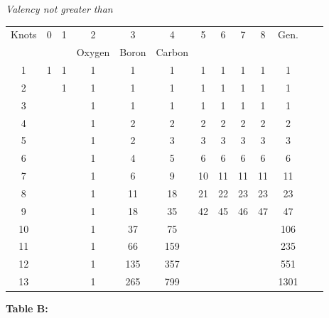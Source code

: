 \documentclass[11pt,a4paper]{article}
\begin{document}
\begin{small}
\begin{center}
\textit{Valency not greater than}
\end{center}
\begin{center}
\begin{tabular}{|c|c|cc|cc|cccccc|c|}
\hline
Knots & 0 & 1 & 2 & 3 & 4 & 5 & 6 & 7 & 8 & Gen. \\
      &   &   & Oxygen & Boron & Carbon & & & & & \\
\hline
1  & 1 & 1 & 1 & 1 & 1 & 1 & 1 & 1 & 1 & 1 \\
2  &   & 1 & 1 & 1 & 1 & 1 & 1 & 1 & 1 & 1 \\
3  &   &   & 1 & 1 & 1 & 1 & 1 & 1 & 1 & 1 \\
4  &   &   & 1 & 2 & 2 & 2 & 2 & 2 & 2 & 2 \\
5  &   &   & 1 & 2 & 3 & 3 & 3 & 3 & 3 & 3 \\
6  &   &   & 1 & 4 & 5 & 6 & 6 & 6 & 6 & 6 \\
7  &   &   & 1 & 6 & 9 & 10 & 11 & 11 & 11 & 11 \\
8  &   &   & 1 & 11 & 18 & 21 & 22 & 23 & 23 & 23 \\
9  &   &   & 1 & 18 & 35 & 42 & 45 & 46 & 47 & 47 \\
10 &   &   & 1 & 37 & 75 & & & & & 106 \\
11 &   &   & 1 & 66 & 159 & & & & & 235 \\
12 &   &   & 1 & 135 & 357 & & & & & 551 \\
13 &   &   & 1 & 265 & 799 & & & & & 1301 \\
\hline
\end{tabular}
\end{center}
\end{small}

\begin{center}
\textbf{Table B:}
\end{center}
\end{document}
